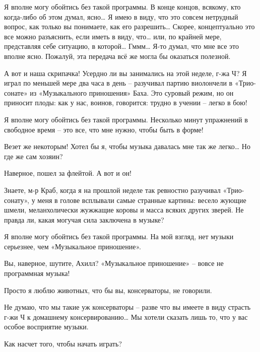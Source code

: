 \documentclass[../main.tex]{subfiles}
\begin{document}
\begin{dialogue}

 Я вполне могу обойтись без такой программы. В конце концов, всякому, кто когда-либо об этом думал, ясно\ldots{} Я имею в виду, что это совсем нетрудный вопрос, как только вы понимаете, как его разрешить\ldots{} Скорее, концептуально это все можно разъяснить, если иметь в виду, что\ldots{} или, по крайней мере, представляя себе ситуацию, в которой\ldots{} Гммм\ldots{} Я-то думал, что мне все это вполне ясно. Пожалуй, эта передача всё же могла бы оказаться полезной.


А вот и наша скрипачка! Усердно ли вы занимались на этой неделе, г-жа Ч? Я играл по меньшей мере два часа в день \--- разучивал партию виолончели в «Трио-сонате» из «Музыкального приношения» Баха. Это суровый режим, но он приносит плоды: как у нас, воинов, говорится: трудно в учении \--- легко в бою!

 Я вполне могу обойтись без такой программы. Несколько минут упражнений в свободное время \--- это все, что мне нужно, чтобы быть в форме!

 Везет же некоторым! Хотел бы я, чтобы музыка давалась мне так же легко\ldots{} Но где же сам хозяин?

 Наверное, пошел за флейтой. А вот и он!


 Знаете, м-р Краб, когда я на прошлой неделе так ревностно разучивал «Трио-сонату», у меня в голове всплывали самые странные картины: весело жующие шмели, меланхолически жужжащие коровы и масса всяких других зверей. Не правда ли, какая могучая сила заключена в музыке?

 Я вполне могу обойтись без такой программы. На мой взгляд, нет музыки серьезнее, чем «Музыкальное приношение».

 Вы, наверное, шутите, Ахилл? «Музыкальное приношение» \--- вовсе не программная музыка!

 Просто я люблю животных, что бы вы, консерваторы, не говорили.

 Не думаю, что мы такие уж консерваторы \--- разве что вы имеете в виду страсть г-жи Ч к домашнему консервированию\ldots{} Мы хотели сказать лишь то, что у вас особое восприятие музыки.

 Как насчет того, чтобы начать играть?


\end{dialogue}
\end{document}
